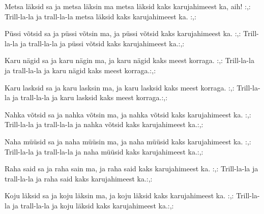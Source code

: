 Metsa l\"aksid sa ja metsa l\"aksin ma
metsa l\"aksid kaks karujahimeest ka, aih!
:,: Trill-la-la ja trall-la-la
metsa l\"aksid kaks karujahimeest ka. :,: 

P\"ussi v\~otsid sa ja p\"ussi v\~otsin ma,
ja p\"ussi v\~otsid kaks karujahimeest ka.
:,: Trill-la-la ja trall-la-la
ja p\"ussi v\~otsid kaks karujahimeest ka.:,: 

Karu n\"agid sa ja karu n\"agin ma,
ja karu n\"agid kaks meest korraga.
:,: Trill-la-la ja trall-la-la
ja karu n\"agid kaks meest korraga.:,: 

Karu lasksid sa ja karu lasksin ma,
ja karu lasksid kaks meest korraga.
:,: Trill-la-la ja trall-la-la
ja karu lasksid kaks meest korraga.:,: 

Nahka v\~otsid sa ja nahka v\~otsin ma,
ja nahka v\~otsid kaks karujahimeest ka.
:,: Trill-la-la ja trall-la-la
ja nahka v\~otsid kaks karujahimeest ka.:,: 

Naha m\"u\"usid sa ja naha m\"u\"usin ma,
ja naha m\"u\"usid kaks karujahimeest ka.
:,: Trill-la-la ja trall-la-la
ja naha m\"u\"usid kaks karujahimeest ka.:,: 

Raha said sa ja raha sain ma,
ja raha said kaks karujahimeest ka.
:,: Trill-la-la ja trall-la-la
ja raha said kaks karujahimeest ka.:,: 

Koju l\"aksid sa ja koju l\"aksin ma,
ja koju l\"aksid kaks karujahimeest ka.
:,: Trill-la-la ja trall-la-la
ja koju l\"aksid kaks karujahimeest ka.:,: 
